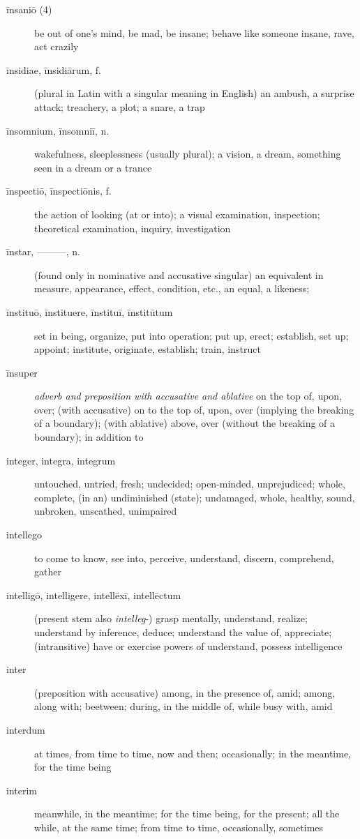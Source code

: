 \begin{description}
    \item[īnsaniō (4)] be out of one's mind, be mad, be insane; behave like someone insane, rave, act crazily
    \item[īnsidiae, īnsidiārum, f.] (plural in Latin with a singular meaning in English) an ambush, a surprise attack; treachery, a plot; a snare, a trap
    \item[īnsomnium, īnsomniī, n.] wakefulness, sleeplessness (usually plural); a vision, a dream, something seen in a dream or a trance
    \item[īnspectiō, īnspectiōnis, f.] the action of looking (at or into); a visual examination, inspection; theoretical examination, inquiry, investigation
    \item[īnstar, ———, n.] (found only in nominative and accusative singular) an equivalent in measure, appearance, effect, condition, etc., an equal, a likeness;
    \item[īnstituō, īnstituere, īnstituī, īnstitūtum] set in being, organize, put into operation; put up, erect; establish, set up; appoint; institute, originate, establish; train, instruct
    \item[īnsuper] \textit{adverb and preposition with accusative and ablative} on the top of, upon, over; (with accusative) on to the top of, upon, over (implying the breaking of a boundary); (with ablative) above, over (without the breaking of a boundary); in addition to
    \item[integer, integra, integrum] \marginnote{*}untouched, untried, fresh; undecided; open-minded, unprejudiced; whole, complete, (in an) undiminished (state); undamaged, whole, healthy, sound, unbroken, unscathed, unimpaired
    \item[intellego] to come to know, see into, perceive, understand, discern, comprehend, gather
    \item[intelligō, intelligere, intellēxī, intellēctum] (present stem also \textit{intelleg}-) grasp mentally, understand, realize; understand by inference, deduce; understand the value of, appreciate; (intransitive) have or exercise powers of understand, possess intelligence
    \item[inter] \marginnote{*}(preposition with accusative) among, in the presence of, amid; among, along with; beetween; during, in the middle of, while busy with, amid
    \item[interdum] at times, from time to time, now and then; occasionally; in the meantime, for the time being
    \item[interim] \marginnote{*}meanwhile, in the meantime; for the time being, for the present; all the while, at the same time; from time to time, occasionally, sometimes

\end{description}
